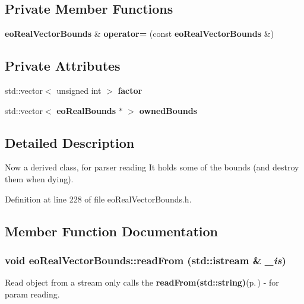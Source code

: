 \subsection*{Private Member Functions}
\begin{CompactItemize}
\item 
{\bf eo\-Real\-Vector\-Bounds} \& {\bf operator=} (const {\bf eo\-Real\-Vector\-Bounds} \&)\label{classeo_real_vector_bounds_d0}

\end{CompactItemize}
\subsection*{Private Attributes}
\begin{CompactItemize}
\item 
std::vector$<$ unsigned int $>$ {\bf factor}\label{classeo_real_vector_bounds_r0}

\item 
std::vector$<$ {\bf eo\-Real\-Bounds} $\ast$ $>$ {\bf owned\-Bounds}\label{classeo_real_vector_bounds_r1}

\end{CompactItemize}


\subsection{Detailed Description}
Now a derived class, for parser reading It holds some of the bounds (and destroy them when dying). 



Definition at line 228 of file eo\-Real\-Vector\-Bounds.h.

\subsection{Member Function Documentation}
\subsubsection{\setlength{\rightskip}{0pt plus 5cm}void eo\-Real\-Vector\-Bounds::read\-From (std::istream \& {\em \_\-is})\hspace{0.3cm}{\tt  [virtual]}}\label{classeo_real_vector_bounds_a7}


Read object from a stream only calls the {\bf read\-From(std::string)}{\rm (p.\,\pageref{classeo_real_vector_bounds_a8})} - for param reading. 

